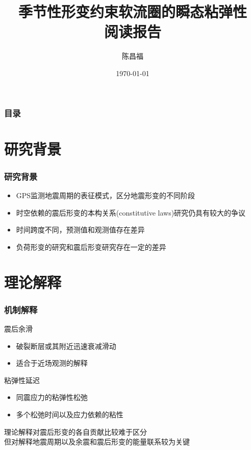\documentclass[12pt]{ctexbeamer}	%
\title{季节性形变约束软流圈的瞬态粘弹性\\阅读报告}	%
\author[陈昌福]{陈昌福}
\institute[西南交通大学]{
大地测量学\\
西南交通大学，测绘遥感信息系
}	%
\date{\today}
\begin{document}
\begin{frame}
\titlepage
\end{frame}


\begin{frame}
\frametitle{目录}
\tableofcontents
\end{frame}


\section{研究背景}
\begin{frame}
\frametitle{研究背景}

\begin{itemize}
    \item<1-> GPS监测地震周期的表征模式，区分地震形变的不同阶段
    \item<2-> 时空依赖的震后形变的本构关系(constitutive laws)研究仍具有较大的争议
    \item<3-> 时间跨度不同，预测值和观测值存在差异
    \item<4-> 负荷形变的研究和震后形变研究存在一定的差异
\end{itemize}
\end{frame}


\section{理论解释}
\begin{frame}
\frametitle{机制解释}
\begin{block}{震后余滑}
	\begin{itemize}
        \item 破裂断层或其附近迅速衰减滑动
		\item 适合于近场观测的解释
	\end{itemize}
\end{block}
\pause
\begin{block}{粘弹性延迟}
	\begin{itemize}
		\item 同震应力的粘弹性松弛
        \item 多个松弛时间以及应力依赖的粘性
	\end{itemize}
\end{block}
\pause
\begin{center}
    \alert {理论解释对震后形变的各自贡献比较难于区分
    \\但对解释地震周期以及余震和震后形变的能量联系较为关键}
\end{center}
\end{frame}
\end{document}

